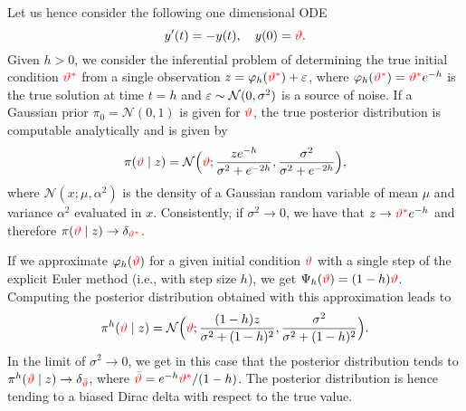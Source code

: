 \documentclass[10pt]{article}
\begin{document}
 Let us hence consider the following one dimensional ODE
\begin{equation}
	y'(t) = -y(t), \quad y(0) = {\color{red}\vartheta}.
\end{equation}
Given $h > 0$, we consider the inferential problem of determining the true initial condition ${\color{red}\vartheta^*}$ from a single observation $z = \varphi_h({\color{red}\vartheta^*}) + \varepsilon$, where $\varphi_h({\color{red}\vartheta^*}) = {\color{red}\vartheta^*}e^{-h}$ is the true solution at time $t =  h$ and $\varepsilon \sim \mathcal N (0, \sigma^2)$ is a source of noise.  If a Gaussian prior $\pi_0 = \mathcal N(0, 1)$ is given for ${\color{red}\vartheta}$, the true posterior distribution is computable analytically and is given by
\begin{equation}\label{eq:ExPosteriorEx}
	\pi({\color{red}\vartheta} \mid z) = \mathcal N\Big({\color{red}\vartheta}; \frac{ze^{-h}}{\sigma^2 + e^{-2h}}, \frac{\sigma^2}{\sigma^2 + e^{-2h}}\Big),
\end{equation}
where $\mathcal N(x; \mu, \alpha^2)$ is the density of a Gaussian random variable of mean $\mu$ and variance $\alpha^2$ evaluated in $x$. Consistently, if $\sigma^2 \to 0$, we have that $z \to {\color{red}\vartheta^*}e^{-h}$ and therefore $\pi({\color{red}\vartheta} \mid z) \to \delta_{{\color{red}\vartheta^*}}$. 

If we approximate $\varphi_h({\color{red}\vartheta})$ for a given initial condition ${\color{red}\vartheta}$ with a single step of the explicit Euler method (i.e., with step size $h$), we get $\Psi_h({\color{red}\vartheta}) = (1 - h){\color{red}\vartheta}$. Computing the posterior distribution obtained with this approximation leads to 
\begin{equation}\label{eq:ExPosteriorRK}
\pi^h({\color{red}\vartheta} \mid z) = \mathcal N\Big({\color{red}\vartheta}; \frac{(1 - h)z}{\sigma^2 + (1- h)^2}, \frac{\sigma^2}{\sigma^2 + (1 - h)^2}\Big).
\end{equation}
In the limit of $\sigma^2 \to 0$, we get in this case that the posterior distribution tends to $\pi^h({\color{red}\vartheta} \mid z) \to \delta_{{\color{red}\bar {\vartheta}}}$, where ${\color{red}\bar {\vartheta}} = e^{-h}{\color{red}\vartheta^*} / (1 - h)$. The posterior distribution is hence tending to a biased Dirac delta with respect to the true value.
\end{document}
